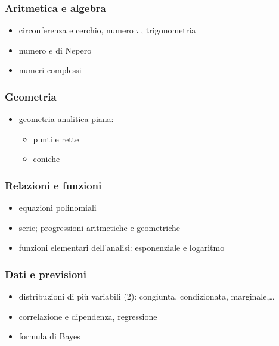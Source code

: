\documentclass[letterpaper,10pt,english]{jupyterBook}
\begin{document}
\subsubsection*{Aritmetica e algebra}
\begin{itemize}
\item {} 
\sphinxAtStartPar
circonferenza e cerchio, numero \(\pi\), trigonometria

\item {} 
\sphinxAtStartPar
numero \(e\) di Nepero

\item {} 
\sphinxAtStartPar
numeri complessi

\end{itemize}
\subsubsection*{Geometria}
\begin{itemize}
\item {} 
\sphinxAtStartPar
geometria analitica piana:
\begin{itemize}
\item {} 
\sphinxAtStartPar
punti e rette

\item {} 
\sphinxAtStartPar
coniche  

\end{itemize}

\end{itemize}
\subsubsection*{Relazioni e funzioni}
\begin{itemize}
\item {} 
\sphinxAtStartPar
equazioni polinomiali

\item {} 
\sphinxAtStartPar
serie; progressioni aritmetiche e geometriche

\item {} 
\sphinxAtStartPar
funzioni elementari dell’analisi: esponenziale e logaritmo

\end{itemize}
\subsubsection*{Dati e previsioni}
\begin{itemize}
\item {} 
\sphinxAtStartPar
distribuzioni di più variabili (2): congiunta, condizionata, marginale,…

\item {} 
\sphinxAtStartPar
correlazione e dipendenza, regressione

\item {} 
\sphinxAtStartPar
formula di Bayes

\end{itemize}
\end{document}
